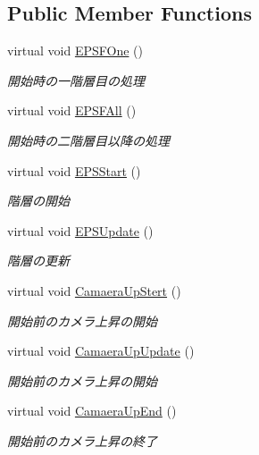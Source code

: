 \subsection*{Public Member Functions}
\begin{DoxyCompactItemize}
\item 
virtual void \hyperlink{class_enemy_pop_system_acf99799679b3492826bfc9d0831bc133}{E\+P\+S\+F\+One} ()
\begin{DoxyCompactList}\small\item\em 開始時の一階層目の処理 \end{DoxyCompactList}\item 
virtual void \hyperlink{class_enemy_pop_system_a7959c0ca2427fb054d2592e7a068fa7e}{E\+P\+S\+F\+All} ()
\begin{DoxyCompactList}\small\item\em 開始時の二階層目以降の処理 \end{DoxyCompactList}\item 
virtual void \hyperlink{class_enemy_pop_system_ac3881414166c809e8958d01e46ba1f91}{E\+P\+S\+Start} ()
\begin{DoxyCompactList}\small\item\em 階層の開始 \end{DoxyCompactList}\item 
virtual void \hyperlink{class_enemy_pop_system_a35ab795e11acf6b03ae726ca276852a2}{E\+P\+S\+Update} ()
\begin{DoxyCompactList}\small\item\em 階層の更新 \end{DoxyCompactList}\item 
virtual void \hyperlink{class_enemy_pop_system_a0dff3d5cf8729600043c1875be746eed}{Camaera\+Up\+Stert} ()
\begin{DoxyCompactList}\small\item\em 開始前のカメラ上昇の開始 \end{DoxyCompactList}\item 
virtual void \hyperlink{class_enemy_pop_system_af242685f6dfd6d73c04ad284c7ae714c}{Camaera\+Up\+Update} ()
\begin{DoxyCompactList}\small\item\em 開始前のカメラ上昇の開始 \end{DoxyCompactList}\item 
virtual void \hyperlink{class_enemy_pop_system_a86c3886d3f4603c9acf3356afadcc72a}{Camaera\+Up\+End} ()
\begin{DoxyCompactList}\small\item\em 開始前のカメラ上昇の終了 \end{DoxyCompactList}\item 

\end{DoxyCompactItemize}
